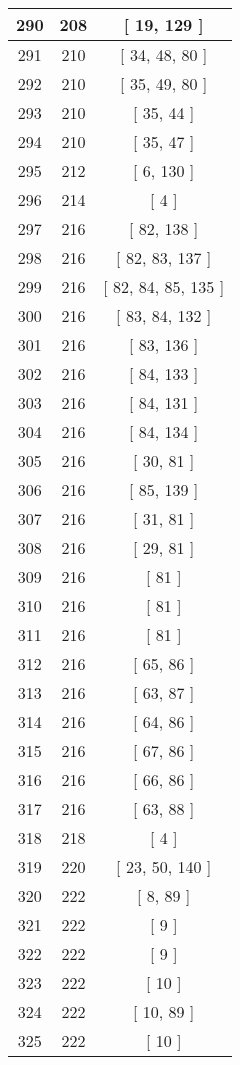 \begin{center}
\begin{longtable}[H]{|| c c c ||}
\hline
290 & 208 & [ 19, 129 ] \\ 
\hline
291 & 210 & [ 34, 48, 80 ] \\ 
\hline
292 & 210 & [ 35, 49, 80 ] \\ 
\hline
293 & 210 & [ 35, 44 ] \\ 
\hline
294 & 210 & [ 35, 47 ] \\ 
\hline
295 & 212 & [ 6, 130 ] \\ 
\hline
296 & 214 & [ 4 ] \\ 
\hline
297 & 216 & [ 82, 138 ] \\ 
\hline
298 & 216 & [ 82, 83, 137 ] \\ 
\hline
299 & 216 & [ 82, 84, 85, 135 ] \\ 
\hline
300 & 216 & [ 83, 84, 132 ] \\ 
\hline
301 & 216 & [ 83, 136 ] \\ 
\hline
302 & 216 & [ 84, 133 ] \\ 
\hline
303 & 216 & [ 84, 131 ] \\ 
\hline
304 & 216 & [ 84, 134 ] \\ 
\hline
305 & 216 & [ 30, 81 ] \\ 
\hline
306 & 216 & [ 85, 139 ] \\ 
\hline
307 & 216 & [ 31, 81 ] \\ 
\hline
308 & 216 & [ 29, 81 ] \\ 
\hline
309 & 216 & [ 81 ] \\ 
\hline
310 & 216 & [ 81 ] \\ 
\hline
311 & 216 & [ 81 ] \\ 
\hline
312 & 216 & [ 65, 86 ] \\ 
\hline
313 & 216 & [ 63, 87 ] \\ 
\hline
314 & 216 & [ 64, 86 ] \\ 
\hline
315 & 216 & [ 67, 86 ] \\ 
\hline
316 & 216 & [ 66, 86 ] \\ 
\hline
317 & 216 & [ 63, 88 ] \\ 
\hline
318 & 218 & [ 4 ] \\ 
\hline
319 & 220 & [ 23, 50, 140 ] \\ 
\hline
320 & 222 & [ 8, 89 ] \\ 
\hline
321 & 222 & [ 9 ] \\ 
\hline
322 & 222 & [ 9 ] \\ 
\hline
323 & 222 & [ 10 ] \\ 
\hline
324 & 222 & [ 10, 89 ] \\ 
\hline
325 & 222 & [ 10 ] \\ 

\end{longtable}
\end{center}
